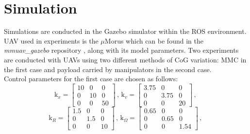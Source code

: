 \section{Simulation} \label{sec:simulation}
Simulations are conducted in the Gazebo simulator within the ROS environment. UAV used in experiments is the $\mu$Morus which can be found in the \textit{mmuav\_gazebo} repository \cite{gitLink}, along with its model parameters. Two experiments are conducted with UAVs using two different methods of CoG variation: MMC in the first case and payload carried by manipulators in the second case. \\
Control parameters for the first case are chosen as follows:
\begin{equation*}
	\text{k}_x = 
	\begin{bmatrix}
		10 &  0  &  0 \\
		 0 & 10  &	0 \\ 
		 0 &  0  & 50 	
	\end{bmatrix}
	\, , \,	
	\text{k}_v =
	\begin{bmatrix}
		3.75 & 0 & 0 \\
		0 & 3.75 & 0 \\
		0 & 0 & 20
	\end{bmatrix}
	\, , \,
\end{equation*}
\begin{equation*}
	\text{k}_R = 
	\begin{bmatrix}
		1.5 & 0 & 0 \\
		0 & 1.5 & 0 \\
		0 & 0 & 10
	\end{bmatrix}
	\, , \,
	\text{k}_\Omega = 
	\begin{bmatrix}
		0.65 & 0 & 0 \\
		0 & 0.65 & 0 \\
		0 & 0 & 1.54
	\end{bmatrix}
	\, , \,
\end{equation*}

